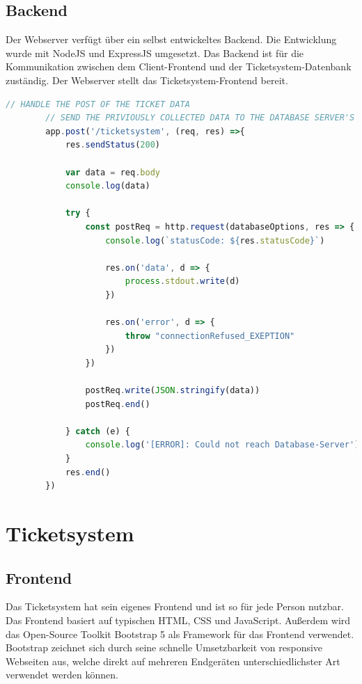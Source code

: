 \documentclass{scrartcl}
\begin{document}
\begin{flushleft}
    \subsection{Backend}
    Der Webserver verfügt über ein selbst entwickeltes Backend. Die Entwicklung wurde mit NodeJS und ExpressJS umgesetzt. Das Backend ist für die Kommunikation zwischen dem Client-Frontend und der Ticketsystem-Datenbank zuständig. Der Webserver stellt das Ticketsystem-Frontend bereit.

    \begin{lstlisting}[language=JavaScript, caption={Webserver API-Endpunkt: Ticket in Datenbank aufnehmen}, captionpos=t]
        // HANDLE THE POST OF THE TICKET DATA
        // SEND THE PRIVIOUSLY COLLECTED DATA TO THE DATABASE SERVER'S API
        app.post('/ticketsystem', (req, res) =>{
            res.sendStatus(200)  
            
            var data = req.body
            console.log(data)

            try {
                const postReq = http.request(databaseOptions, res => {
                    console.log(`statusCode: ${res.statusCode}`)

                    res.on('data', d => {
                        process.stdout.write(d)
                    })    

                    res.on('error', d => {
                        throw "connectionRefused_EXEPTION"
                    })
                })         

                postReq.write(JSON.stringify(data))
                postReq.end() 

            } catch (e) {
                console.log('[ERROR]: Could not reach Database-Server')
            }
            res.end()
        })\end{lstlisting}

    \newpage

    \section{Ticketsystem}
    \subsection{Frontend}
    Das Ticketsystem hat sein eigenes Frontend und ist so für jede Person nutzbar. Das Frontend basiert auf typischen HTML, CSS und JavaScript. Außerdem wird das Open-Source Toolkit Bootstrap 5 als Framework für das Frontend verwendet. Bootstrap zeichnet sich durch seine schnelle Umsetzbarkeit von responsive Webseiten aus, welche direkt auf mehreren Endgeräten unterschiedlichster Art verwendet werden können.   
    

\end{flushleft}
\end{document}
